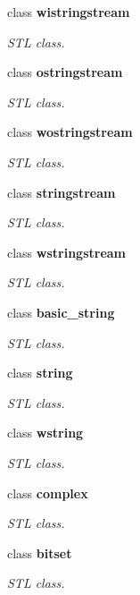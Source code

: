 \begin{DoxyCompactItemize}
class {\bfseries wistringstream}
\begin{DoxyCompactList}\small\item\em STL class. \end{DoxyCompactList}\item 
class {\bfseries ostringstream}
\begin{DoxyCompactList}\small\item\em STL class. \end{DoxyCompactList}\item 
class {\bfseries wostringstream}
\begin{DoxyCompactList}\small\item\em STL class. \end{DoxyCompactList}\item 
class {\bfseries stringstream}
\begin{DoxyCompactList}\small\item\em STL class. \end{DoxyCompactList}\item 
class {\bfseries wstringstream}
\begin{DoxyCompactList}\small\item\em STL class. \end{DoxyCompactList}\item 
class {\bfseries basic\_\-string}
\begin{DoxyCompactList}\small\item\em STL class. \end{DoxyCompactList}\item 
class {\bfseries string}
\begin{DoxyCompactList}\small\item\em STL class. \end{DoxyCompactList}\item 
class {\bfseries wstring}
\begin{DoxyCompactList}\small\item\em STL class. \end{DoxyCompactList}\item 
class {\bfseries complex}
\begin{DoxyCompactList}\small\item\em STL class. \end{DoxyCompactList}\item 
class {\bfseries bitset}
\begin{DoxyCompactList}\small\item\em STL class. \end{DoxyCompactList}\item 

\end{DoxyCompactItemize}
